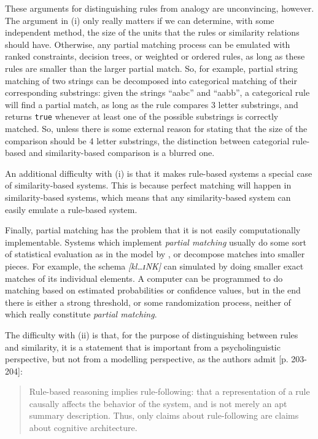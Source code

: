 These arguments for distinguishing rules from analogy are unconvincing, however. The argument in (i) only really matters if we can determine, with some independent method, the size of the units that the rules or similarity relations should have. Otherwise, any partial matching process can be emulated with ranked constraints, decision trees, or weighted or ordered rules, as long as these rules are smaller than the larger partial match. So, for example, partial string matching of two strings can be decomposed into categorical matching of their corresponding substrings: given the strings ``aabc'' and ``aabb'', a categorical rule will find a partial match, as long as the rule compares 3 letter substrings, and returns \texttt{true} whenever at least one of the possible substrings is correctly matched. So, unless there is some external reason for stating that the size of the comparison should be 4 letter substrings, the distinction between categorial rule-based and similarity-based comparison is a blurred one.

An additional difficulty with (i) is that it makes rule-based systems a special case of similar\-ity-based systems. This is because perfect matching will happen in similarity-based systems, which means that any similarity-based system can easily emulate a rule-based system.

Finally, partial matching has the problem that it is not easily computationally implementable. Systems which implement \textit{partial matching} usually do some sort of statistical evaluation as in the model by \textcite{Albright.2003}, or decompose matches into smaller pieces. For example, the schema \textit{[kl\dots ɪNK]} can simulated by doing smaller exact matches of its individual elements. A computer can be programmed to do matching based on estimated probabilities or confidence values, but in the end there is either a strong threshold, or some randomization process, neither of which really constitute \textit{partial matching}.

The difficulty with (ii) is that, for the purpose of distinguishing between rules and similarity, it is a statement that is important from a psycholinguistic perspective, but not from a modelling perspective, as the authors admit [p. 203-204]:

\begin{quotation}
Rule-based reasoning implies rule-following: that a representation of a rule causally affects the behavior of the system, and is not merely an apt summary description. Thus, only claims about rule-following are claims about cognitive architecture.
\end{quotation}

